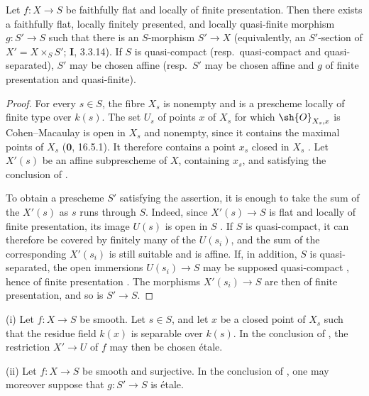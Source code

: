 \begin{corollary}[17.16.2]
\label{IV.17.16.2}
Let $f:X\to S$ be faithfully flat and locally of finite presentation.  Then there exists a faithfully flat, locally finitely presented, and locally quasi-finite morphism $g:S'\to S$ such that there is an $S$-morphism $S'\to X$ (equivalently, an $S'$-section of $X'=X\times_SS'$; $\mathbf{I}$, 3.3.14).
If $S$ is quasi-compact (resp.\ quasi-compact and quasi-separated), $S'$ may be chosen affine (resp.\ $S'$ may be chosen affine and $g$ of finite presentation and quasi-finite).
\end{corollary}

\begin{proof}
For every $s\in S$, the fibre $X_s$ is nonempty and is a prescheme locally of finite type over $k(s)$.  The set $U_s$ of points $x$ of $X_s$ for which $\sh{O}_{X_s,x}$ is Cohen--Macaulay is open in $X_s$  and nonempty, since it contains the maximal points of $X_s$ ($\mathbf{0}$, 16.5.1).  It therefore contains a point $x_s$ closed in $X_s$ .  Let $X'(s)$ be an affine subprescheme of $X$, containing $x_s$, and satisfying the conclusion of .

To obtain a prescheme $S'$ satisfying the assertion, it is enough to take the sum of the $X'(s)$ as $s$ runs through $S$.  Indeed, since $X'(s)\to S$ is flat and locally of finite presentation, its image $U(s)$ is open in $S$ .  If $S$ is quasi-compact, it can therefore be covered by finitely many of the $U(s_i)$, and the sum of the corresponding $X'(s_i)$ is still suitable and is affine.  If, in addition, $S$ is quasi-separated, the open immersions $U(s_i)\to S$ may be supposed quasi-compact , hence of finite presentation .  The morphisms $X'(s_i)\to S$ are then of finite presentation, and so is $S'\to S$.
\end{proof}

\begin{corollary}[17.16.3]
\label{IV.17.16.3}
(i) Let $f:X\to S$ be smooth.  Let $s\in S$, and let $x$ be a closed point of $X_s$ such that the residue field $k(x)$ is separable over $k(s)$.  In the conclusion of , the restriction $X'\to U$ of $f$ may then be chosen \'etale.

(ii)
Let $f:X\to S$ be smooth and surjective.  In the conclusion of , one may moreover suppose that $g:S'\to S$ is \'etale.
\end{corollary}

